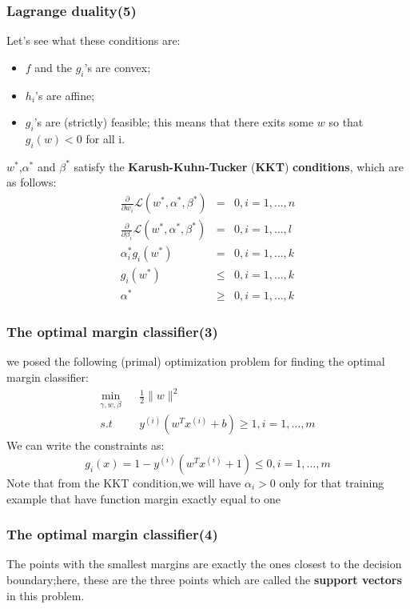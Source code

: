 \documentclass[slidestop,compress,mathserif]{beamer}
\begin{document}
    \begin{frame}[shrink]
        \frametitle{Lagrange duality(5)}
        Let's see what these conditions are:
        \begin{itemize}
          \item $f$ and the $g_i$'s are convex;
          \item $h_i$'s are affine;
          \item $g_i$'s are (strictly) feasible; this means that there exits some $w$ so that $g_i(w)<0$ for all i.
        \end{itemize}
        $w^*$,$\alpha^*$ and $\beta^*$ satisfy the \textbf{Karush-Kuhn-Tucker} (\textbf{KKT}) \textbf{conditions}, which are as follows:
        \begin{eqnarray*}
            \frac{\partial}{\partial w_i}\mathcal{L}(w^*,\alpha^*,\beta^*) &=& 0,i=1,\ldots,n\\
            \frac{\partial}{\partial \beta_i}\mathcal{L}(w^*,\alpha^*,\beta^*)&=& 0,i=1,\ldots,l\\
            \alpha_i^*g_i(w^*) &=& 0,i=1,\ldots,k\\
            g_i(w^*) &\le& 0,i=1,\ldots,k\\
            \alpha^* &\ge& 0,i=1,\ldots,k
        \end{eqnarray*}
    \end{frame}
    \begin{frame}
        \frametitle{The optimal margin classifier(3)}
        we posed the following (primal) optimization
         problem for finding the optimal 
         margin classifier:
         \begin{eqnarray*}
         	\min_{\gamma,w,\beta} && \frac{1}{2}\|w\|^2\\
         	s.t && y^{(i)}(w^Tx^{(i)}+b)\ge 1,i=1,\ldots,m
         \end{eqnarray*}
         We can write the constraints as:
         $$g_i(x)=1-y^{(i)}(w^Tx^{(i)}+1)\le 0,i=1,\ldots,m$$
         Note that from the KKT condition,we will have $\alpha_i>0$
         only for that training example that have function margin 
         exactly equal to one 
    \end{frame}
    \begin{frame}
    	\frametitle{The optimal margin classifier(4)}
    	\begin{figure}
        \end{figure}
        The points with the smallest margins are exactly
         the ones closest to the decision boundary;here,
          these are the three points which are called 
          the \textbf{support vectors} in this problem.
    \end{frame}
\end{document}
